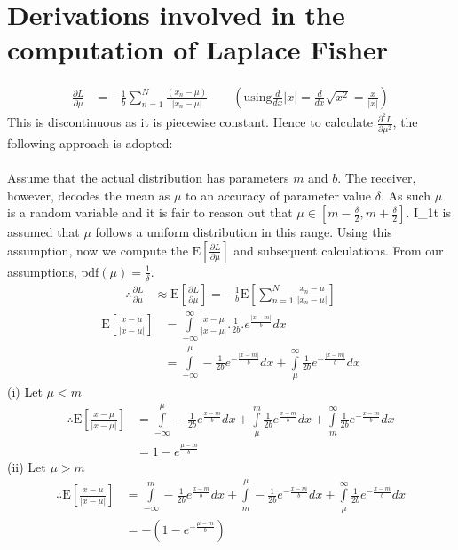 \documentclass[wcp]{jmlr}
\begin{document}
\section{Derivations involved in the computation of Laplace Fisher}
\label{apd:laplace_fisher}
\begin{align*}
 \frac{\partial L}{\partial \mu} &= -\frac{1}{b} \sum_{n=1}^N \frac{(x_n-\mu)}{|x_n-\mu|} \quad\quad\left(\mathrm{using} \frac{d}{dx}|x| = \frac{d}{dx}\sqrt{x^2} = \frac{x}{|x|}\right)
\end{align*}
This is discontinuous as it is piecewise constant. Hence to calculate $\frac{\partial^2 L}{\partial \mu^2}$, the following approach is adopted: \\\\
Assume that the actual distribution has parameters $m$ and 
$b$. The receiver, however, decodes the mean as $\mu$ to an accuracy of parameter
value $\delta$. As such $\mu$ is a random variable and it is fair to reason out
that $\mu \in \left[m-\frac{\delta}{2},m+\frac{\delta}{2}\right]$. I_1t is 
assumed that $\mu$ follows a uniform distribution in this range. Using this 
assumption, now we compute the $\mathrm{E}\left[\frac{\partial L}{\partial \mu}\right]$ 
and subsequent calculations. From our assumptions, $\mathrm{pdf}(\mu) = \frac{1}{\delta}$.
\begin{align*}
 \therefore \frac{\partial L}{\partial \mu} &\approx \mathrm{E}\left[\frac{\partial L}{\partial \mu}\right] = -\frac{1}{b}\mathrm{E}\left[\sum_{n=1}^{N}\frac{x_n-\mu}{|x_n-\mu|}\right]
\end{align*}
\begin{align*}
 \mathrm{E}\left[\frac{x-\mu}{|x-\mu|}\right] &= \int\limits_{-\infty}^{\infty} \frac{x-\mu}{|x-\mu|}.\frac{1}{2b}.e^{\frac{|x-m|}{b}} dx \\
 &= \int\limits_{-\infty}^{\mu} -\frac{1}{2b} e^{-\frac{|x-m|}{b}} dx + \int\limits_{\mu}^{\infty} \frac{1}{2b} e^{-\frac{|x-m|}{b}} dx
\end{align*}
(i) Let $\mu < m$
\begin{align*}
 \therefore \mathrm{E}\left[\frac{x-\mu}{|x-\mu|}\right] &= \int\limits_{-\infty}^{\mu} -\frac{1}{2b} e^{\frac{x-m}{b}} dx + \int\limits_{\mu}^{m} \frac{1}{2b} e^{\frac{x-m}{b}} dx + \int\limits_{m}^{\infty} \frac{1}{2b} e^{-\frac{x-m}{b}} dx \\
 &= 1 - e^{\frac{\mu-m}{b}}
\end{align*}
(ii) Let $\mu > m$
\begin{align*}
 \therefore \mathrm{E}\left[\frac{x-\mu}{|x-\mu|}\right] &= \int\limits_{-\infty}^{m} -\frac{1}{2b} e^{\frac{x-m}{b}} dx + \int\limits_{m}^{\mu} -\frac{1}{2b} e^{-\frac{x-m}{b}} dx + \int\limits_{\mu}^{\infty} \frac{1}{2b} e^{-\frac{x-m}{b}} dx \\
 &= -(1 - e^{-\frac{\mu-m}{b}})
\end{align*}
\end{document}
